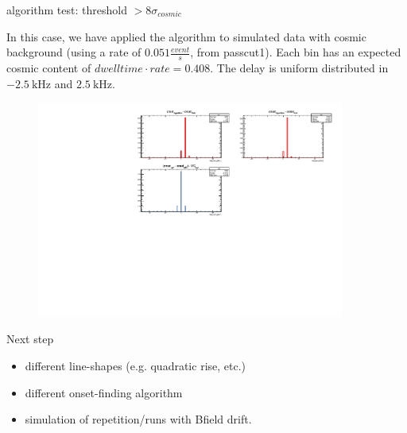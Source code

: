 \documentclass[9pt]{beamer}
\begin{document}
\begin{frame}{algorithm test: threshold $ > 8 \sigma_{cosmic}$}

In this case, we have applied the algorithm to simulated data with cosmic background (using a rate of $0.051 \frac{event}{s}$, from passcut1). Each bin has an expected cosmic content of $dwelltime \cdot rate = 0.408$.
The delay is uniform distributed in $\SI{-2.5}{\kilo \hertz}$ and $\SI{+2.5}{\kilo \hertz}$. 
\begin{figure}
\includegraphics[width = 0.9\textwidth]{../Plot/OnsetResult15.pdf}
\end{figure}

\end{frame}

\begin{frame}{Next step}
\begin{itemize}
\item different line-shapes (e.g. quadratic rise, etc.)
\item different onset-finding algorithm
\item simulation of repetition/runs with Bfield drift.
\end{itemize}

\end{frame}
\end{document}
